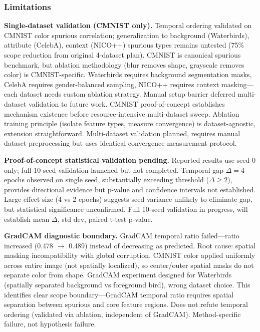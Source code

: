 \subsubsection{Limitations}

\textbf{Single-dataset validation (CMNIST only).} Temporal ordering validated on CMNIST color spurious correlation; generalization to background (Waterbirds), attribute (CelebA), context (NICO++) spurious types remains untested (75\% scope reduction from original 4-dataset plan). CMNIST is canonical spurious benchmark, but ablation methodology (blur removes shape, grayscale removes color) is CMNIST-specific. Waterbirds requires background segmentation masks, CelebA requires gender-balanced sampling, NICO++ requires context masking---each dataset needs custom ablation strategy. Manual setup barrier deferred multi-dataset validation to future work. CMNIST proof-of-concept establishes mechanism existence before resource-intensive multi-dataset sweep. Ablation training principle (isolate feature types, measure convergence) is dataset-agnostic, extension straightforward. Multi-dataset validation planned, requires manual dataset preprocessing but uses identical convergence measurement protocol.

\textbf{Proof-of-concept statistical validation pending.} Reported results use seed 0 only; full 10-seed validation launched but not completed. Temporal gap $\Delta=4$ epochs observed on single seed, substantially exceeding threshold ($\Delta \geq 2$), provides directional evidence but p-value and confidence intervals not established. Large effect size (4 vs 2 epochs) suggests seed variance unlikely to eliminate gap, but statistical significance unconfirmed. Full 10-seed validation in progress, will establish mean $\Delta$, std dev, paired t-test p-value.

\textbf{GradCAM diagnostic boundary.} GradCAM temporal ratio failed---ratio increased (0.478 $\rightarrow$ 0.489) instead of decreasing as predicted. Root cause: spatial masking incompatibility with global corruption. CMNIST color applied uniformly across entire image (not spatially localized), so center/outer spatial masks do not separate color from shape. GradCAM experiment designed for Waterbirds (spatially separated background vs foreground bird), wrong dataset choice. This identifies clear scope boundary---GradCAM temporal ratio requires spatial separation between spurious and core feature regions. Does not refute temporal ordering (validated via ablation, independent of GradCAM). Method-specific failure, not hypothesis failure.


